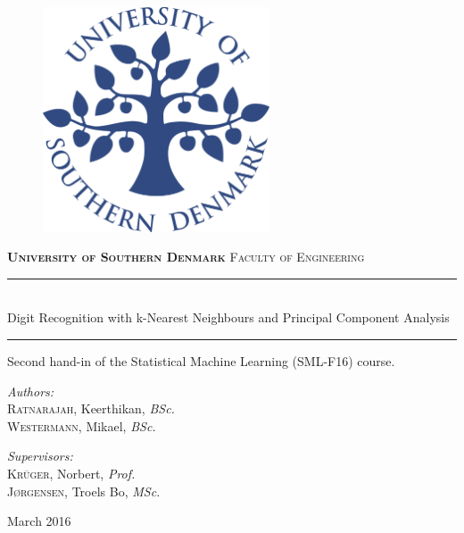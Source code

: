 %
\begin{titlepage}
\begin{center}
\begin{figure}[h]
\centering
\includegraphics[width=0.6\textwidth]{graphics/forside.png}
\end{figure}
\vskip1cm
{
\bfseries
\textsc{\huge University of Southern Denmark}
\vskip0.4cm
}
\textsc{\LARGE Faculty of Engineering}
\vskip0.8cm
{
\bfseries
\rule{\linewidth}{0.5mm} \\[0.4cm]
{\huge Digit Recognition with k-Nearest Neighbours and Principal Component Analysis \\[0.35cm] }
\rule{\linewidth}{0.5mm}
}
\vskip0.5cm
{Second hand-in of the Statistical Machine Learning (SML-F16) course.}
\vskip2cm

\begin{minipage}[t]{0.4\textwidth}
\begin{flushleft}
\large \emph{Authors:}\\
\textsc{Ratnarajah}, Keerthikan, \textit{BSc.}\\
\textsc{Westermann}, Mikael, \textit{BSc.}
\end{flushleft}
\end{minipage}
\begin{minipage}[t]{0.4\textwidth}
\begin{flushright}
\large \emph{Supervisors:}\\
\textsc{Krüger}, Norbert, \textit{Prof.} \\
\textsc{Jørgensen}, Troels Bo, \textit{MSc.} 
\end{flushright}
\end{minipage}
\vfill
{March 2016}

\end{center}
\end{titlepage}